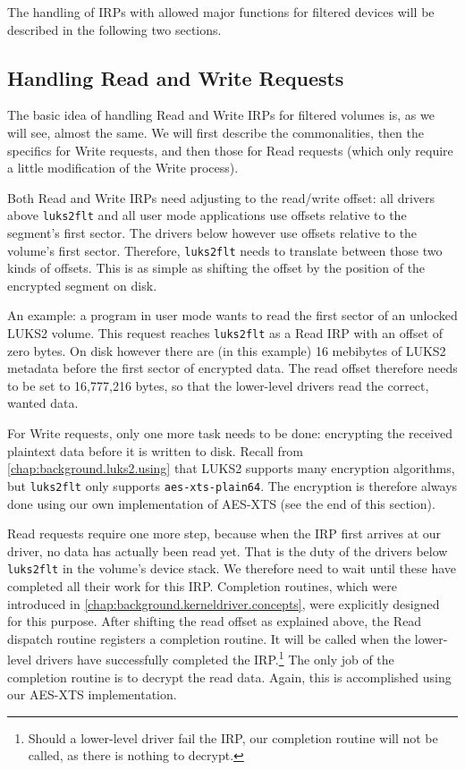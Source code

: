 The handling of IRPs with allowed major functions for filtered devices will be described in the following two sections.

\subsection{Handling Read and Write Requests}
\label{chap:ourapproach.final.de_encrypting}
The basic idea of handling Read and Write IRPs for filtered volumes is, as we will see, almost the same. We will first describe the commonalities, then the specifics for Write requests, and then those for Read requests (which only require a little modification of the Write process).

Both Read and Write IRPs need adjusting to the read/write offset: all drivers above \texttt{luks2flt} and all user mode applications use offsets relative to the segment's first sector. The drivers below however use offsets relative to the volume's first sector. Therefore, \texttt{luks2flt} needs to translate between those two kinds of offsets. This is as simple as shifting the offset by the position of the encrypted segment on disk.

An example: a program in user mode wants to read the first sector of an unlocked LUKS2 volume. This request reaches \texttt{luks2flt} as a Read IRP with an offset of zero bytes. On disk however there are (in this example) 16 mebibytes of LUKS2 metadata before the first sector of encrypted data. The read offset therefore needs to be set to 16,777,216 bytes, so that the lower-level drivers read the correct, wanted data.

For Write requests, only one more task needs to be done: encrypting the received plaintext data before it is written to disk. Recall from \autoref{chap:background.luks2.using} that LUKS2 supports many encryption algorithms, but \texttt{luks2flt} only supports \texttt{aes-xts-plain64}. The encryption is therefore always done using our own implementation of AES-XTS (see the end of this section).

Read requests require one more step, because when the IRP first arrives at our driver, no data has actually been read yet. That is the duty of the drivers below \texttt{luks2flt} in the volume's device stack. We therefore need to wait until these have completed all their work for this IRP. Completion routines, which were introduced in \autoref{chap:background.kerneldriver.concepts}, were explicitly designed for this purpose. After shifting the read offset as explained above, the Read dispatch routine registers a completion routine. It will be called when the lower-level drivers have successfully completed the IRP.\footnote{\label{fn:ourapproach.final.failedlowerlevel} Should a lower-level driver fail the IRP, our completion routine will not be called, as there is nothing to decrypt.} The only job of the completion routine is to decrypt the read data. Again, this is accomplished using our AES-XTS implementation.

